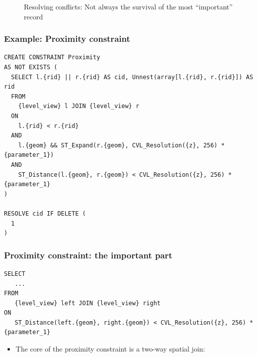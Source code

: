 \documentclass{beamer}
\begin{document}
{\begin{center}
\begin{figure}
  	\caption{Resolving conflicts: Not always the survival of the most ``important'' record}
  \end{figure}
  \end{center}
}


\begin{frame}[fragile]
\frametitle{Example: Proximity constraint}
\begin{lstlisting}
CREATE CONSTRAINT Proximity
AS NOT EXISTS (
  SELECT l.{rid} || r.{rid} AS cid, Unnest(array[l.{rid}, r.{rid}]) AS rid
  FROM
    {level_view} l JOIN {level_view} r
  ON
    l.{rid} < r.{rid}
  AND
    l.{geom} && ST_Expand(r.{geom}, CVL_Resolution({z}, 256) * {parameter_1})
  AND
    ST_Distance(l.{geom}, r.{geom}) < CVL_Resolution({z}, 256) * {parameter_1}
)

RESOLVE cid IF DELETE (
  1
)
\end{lstlisting}
\end{frame}

\begin{frame}[fragile]
\frametitle{Proximity constraint: the important part}
\begin{lstlisting}
SELECT
   ...
FROM 
   {level_view} left JOIN {level_view} right
ON 
   ST_Distance(left.{geom}, right.{geom}) < CVL_Resolution({z}, 256) * {parameter_1}
\end{lstlisting}
\begin{itemize}
\item The core of the proximity constraint is a two-way spatial join:
\end{itemize}

\end{frame}

\end{document}
